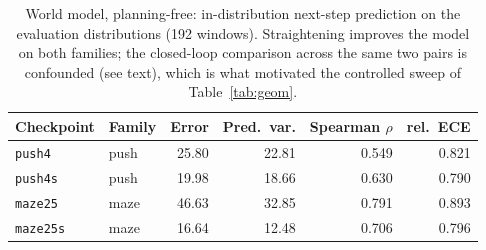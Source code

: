 \begin{table}[t]\centering
\caption{World model, planning-free: in-distribution next-step prediction on the evaluation
distributions (192 windows). Straightening improves the model on both families; the closed-loop
comparison across the same two pairs is confounded (see text), which is what motivated the
controlled sweep of Table~\ref{tab:geom}.}
\label{tab:wm}\small
\begin{tabular}{llrrrr}
\toprule
Checkpoint & Family & Error & Pred.\ var. & Spearman $\rho$ & rel.\ ECE \\
\midrule
\texttt{push4}  & push & 25.80 & 22.81 & 0.549 & 0.821 \\
\texttt{push4s} & push & 19.98 & 18.66 & 0.630 & 0.790 \\
\texttt{maze25}  & maze & 46.63 & 32.85 & 0.791 & 0.893 \\
\texttt{maze25s} & maze & 16.64 & 12.48 & 0.706 & 0.796 \\
\bottomrule
\end{tabular}
\end{table}
